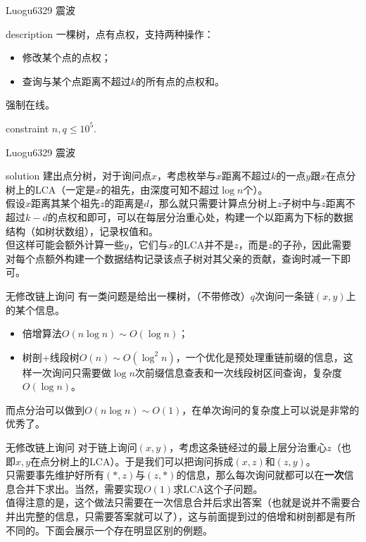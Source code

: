 \documentclass{beamer}
\begin{document}
\begin{frame}{Luogu6329 震波}
\begin{block}{description}
	一棵树，点有点权，支持两种操作：
	\begin{itemize}
		\item 修改某个点的点权；
		\item 查询与某个点距离不超过$k$的所有点的点权和。
	\end{itemize}
	强制在线。
\end{block}
\begin{block}{constraint}
	$n, q \le 10^5.$
\end{block}
\end{frame}
\begin{frame}{Luogu6329 震波}
\begin{block}{solution}
	建出点分树，对于询问点$x$，考虑枚举与$x$距离不超过$k$的一点$y$跟$x$在点分树上的LCA（一定是$x$的祖先，由深度可知不超过$\log n$个）。\\
	
	假设$x$距离其某个祖先$z$的距离是$d$，那么就只需要计算点分树上$z$子树中与$z$距离不超过$k-d$的点权和即可，可以在每层分治重心处，构建一个以距离为下标的数据结构（如树状数组），记录权值和。\\
	
	但这样可能会额外计算一些$y$，它们与$x$的LCA并不是$z$，而是$z$的子孙，因此需要对每个点额外构建一个数据结构记录该点子树对其父亲的贡献，查询时减一下即可。
\end{block}
\end{frame}

\begin{frame}{无修改链上询问}
	有一类问题是给出一棵树，（不带修改）$q$次询问一条链$(x, y)$上的某个信息。
	\begin{itemize}
		\item 倍增算法$O(n\log n) \sim O(\log n)$；
		\item 树剖+线段树$O(n) \sim O(\log^2n)$，一个优化是预处理重链前缀的信息，这样一次询问只需要做$\log n$次前缀信息查表和一次线段树区间查询，复杂度$O(\log n)$。
	\end{itemize}

	而点分治可以做到$O(n\log n) \sim O(1)$，在单次询问的复杂度上可以说是非常的优秀了。
\end{frame}

\begin{frame}{无修改链上询问}
	对于链上询问$(x, y)$，考虑这条链经过的最上层分治重心$z$（也即$x, y$在点分树上的LCA）。于是我们可以把询问拆成$(x, z)$和$(z, y)$。\\
	
	只需要事先维护好所有$(*, z)$与$(z, *)$的信息，那么每次询问就都可以在\textbf{一次}信息合并下求出。当然，需要实现$O(1)$求LCA这个子问题。\\
	
	值得注意的是，这个做法只需要在一次信息合并后求出答案（也就是说并不需要合并出完整的信息，只需要答案就可以了），这与前面提到过的倍增和树剖都是有所不同的。下面会展示一个存在明显区别的例题。
\end{frame}
\end{document}
